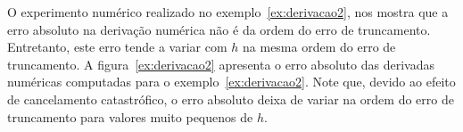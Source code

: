 \begin{obs}
  O experimento numérico realizado no exemplo~\ref{ex:derivacao2}, nos mostra que a erro absoluto na derivação numérica não é da ordem do erro de truncamento. Entretanto, este erro tende a variar com $h$ na mesma ordem do erro de truncamento. A figura~\ref{ex:derivacao2} apresenta o erro absoluto das derivadas numéricas computadas para o exemplo~\ref{ex:derivacao2}. Note que, devido ao efeito de cancelamento catastrófico, o erro absoluto deixa de variar na ordem do erro de truncamento para valores muito pequenos de $h$.
\end{obs}


